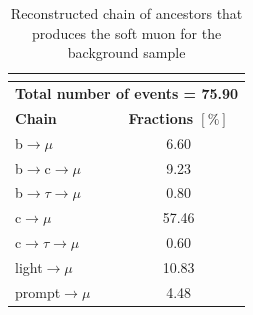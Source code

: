 \begin{table}[!h]
	\centering          
	\begin{tabular}{|l|c|}          
		\hline          
		\multicolumn{2}{|l|}{\textbf{\VVHF}}    \\        
		\hline          
		\multicolumn{2}{|l|}{\textbf{Total number of events = 75.90}}    \\
		\hline
		\textbf{Chain}        									 & \textbf{Fractions $[\%]$} \\                          
		\hline          
		b$\rightarrow \mu$                 					&   6.60  \\          
		b$\rightarrow$c$\rightarrow \mu$     	&    9.23    \\          
		b$\rightarrow \tau \rightarrow \mu$  	&    0.80 \\          
		c$\rightarrow \mu$                 				 &    57.46\\          
		c$\rightarrow \tau \rightarrow \mu$  	&     0.60\\          
		light$\rightarrow \mu$              			&    10.83 \\          
		prompt$\rightarrow \mu$                	 	&  4.48\\            
		\hline    
	\end{tabular}    
	\caption{Reconstructed chain of ancestors that produces the soft muon for the background sample \VVHF }
	\label{tab:VV_comp}
\end{table}    


